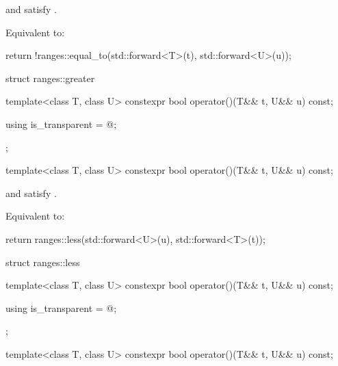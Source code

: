 \begin{itemdescr}
\pnum
\constraints
{} and  satisfy .

\pnum
\effects
Equivalent to:
\begin{codeblock}
return !ranges::equal_to{}(std::forward<T>(t), std::forward<U>(u));
\end{codeblock}
\end{itemdescr}

%
\begin{codeblock}
struct ranges::greater {
  template<class T, class U>
  constexpr bool operator()(T&& t, U&& u) const;

  using is_transparent = @\unspecnc@;
};
\end{codeblock}

\begin{itemdecl}
template<class T, class U>
  constexpr bool operator()(T&& t, U&& u) const;
\end{itemdecl}

\begin{itemdescr}
\pnum
\constraints
{} and  satisfy .

\pnum
\effects
Equivalent to:
\begin{codeblock}
return ranges::less{}(std::forward<U>(u), std::forward<T>(t));
\end{codeblock}
\end{itemdescr}

%
\begin{codeblock}
struct ranges::less {
  template<class T, class U>
    constexpr bool operator()(T&& t, U&& u) const;

  using is_transparent = @\unspecnc@;
};
\end{codeblock}

\begin{itemdecl}
template<class T, class U>
  constexpr bool operator()(T&& t, U&& u) const;
\end{itemdecl}

